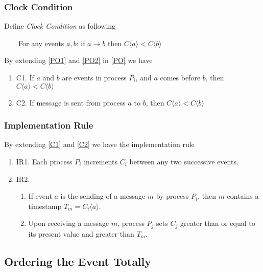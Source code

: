 \documentclass[12pt,a4paper,oneside]{article}
\begin{document}
\subsubsection{Clock Condition} \label{s:LC:s:CC}

Define \textit{Clock Condition} as following

\medskip

\ \ \ \ For any events $a, b$: if $a \rightarrow b$ then $C\langle a \rangle < C\langle b \rangle$

\medskip

By extending \ref{PO1} and \ref{PO2} in \ref{PO} we have

\begin{enumerate}
  \item \label{C1} C1. If $a$ and $b$ are events in process $P_i$, and $a$ comes before $b$, then $C\langle a \rangle < C\langle b \rangle$\cite{l}
  \item \label{C2} C2. If message is sent from process $a$ to $b$, then $C\langle a \rangle < C\langle b \rangle$\
\end{enumerate}

\subsubsection{Implementation Rule} \label{s:LC:s:IR}

By extending \ref{C1} and \ref{C2} we have the implementation rule

\begin{enumerate}
  \item \label{IR1} IR1. Each process $P_i$ increments $C_i$ between any two successive events\cite{l}.
  \item \label{IR2} IR2.
  \begin{enumerate}
    \item If event $a$ is the sending of a message $m$ by process $P_i$, then $m$ contains a timestamp $T_m=C_i\langle a \rangle$\cite{l}.
    \item Upon receiving a message $m$, process $P_j$ sets $C_j$ greater than or equal to its present value and greater than $T_m$\cite{l}.
  \end{enumerate}
\end{enumerate}

\subsection{Ordering the Event Totally} \label{TO}
\end{document}
